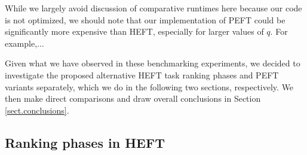 \documentclass[12pt]{article}
\begin{document}
While we largely avoid discussion of comparative runtimes here because our code is not optimized, we should note that our implementation of PEFT could be significantly more expensive than HEFT, especially for larger values of $q$. For example,...

Given what we have observed in these benchmarking experiments, we decided to investigate the proposed alternative HEFT task ranking phases and PEFT variants separately, which we do in the following two sections, respectively. We then make direct comparisons and draw overall conclusions in Section \ref{sect.conclusions}.




\subsection{Ranking phases in HEFT}
\label{subsect.evaluation}
\end{document}
